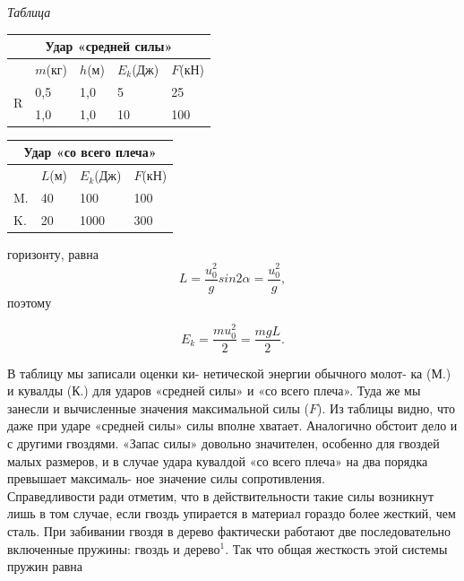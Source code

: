 \fontsize{9}{10pt}\selectfont 

\setcounter{page}{8}
\pagestyle{fancy} 
\fancyhf{}
\renewcommand{\headrulewidth}{0pt}



\begin{multicols}{3}
    \begin{flushright}
        \textit{Таблица}
    \vspace{-2.4mm}
    \end{flushright}
    \begin{tabular}{|p{2mm}|p{7.6mm}|p{7.6mm}|p{11mm}|p{8.6mm}|} \hline
    \multicolumn{5}{|c|}{\textbf{Удар «средней силы»}}\\[5pt]  \hline
     & $m$(кг) & $h$(м) & $E_k$(Дж) & $F$(кН) \\ \hline
     \multirow{2}{*}{R}
    & 0,5 & 1,0 & 5 & 25 \\
    & 1,0 & 1,0 & 10 & 100 \\ \hline
    \end{tabular} 
    \hspace{-17pt}
    \begin{tabular}{|p{2mm}|p{10mm}|p{13mm}|p{16mm}|}
    \multicolumn{4}{|c|}{\textbf{Удар «со всего плеча»}} \\ [5pt] \hline
     & $L$(м) & $E_k$(Дж) & $F$(кН) \\ \hline
    M. & 40 & 100 & 100 \\
    K. & 20 & 1000 & 300 \\ \hline
    \end{tabular}\vspace{15pt}
горизонту, равна
$$L = \frac{u_0^2}{g} sin 2\alpha = \frac{u_0^2}{g},$$
поэтому

$$E_k = \frac{mu_0^2}{2} = \frac{mgL}{2}.$$

В таблицу мы записали оценки ки- нетической энергии обычного молот- ка (М.) и кувалды (К.) для ударов «средней силы» и «со всего плеча». Туда же мы занесли и вычисленные значения максимальной силы ($F$). Из таблицы видно, что даже при ударе «средней силы» силы вполне хватает. Аналогично обстоит дело и с другими гвоздями. «Запас силы» довольно значителен, особенно для гвоздей малых размеров, и в случае удара кувалдой «со всего плеча» на два порядка превышает максималь- ное значение силы сопротивления. \\
Справедливости ради отметим, что в действительности такие силы возникнут лишь в том случае, если гвоздь упирается в материал гораздо более жесткий, чем сталь. При забивании гвоздя в дерево фактически работают
две последовательно включенные пружины: гвоздь и дерево$^1$. Так что общая жесткость этой системы пружин равна


\end{multicols}
